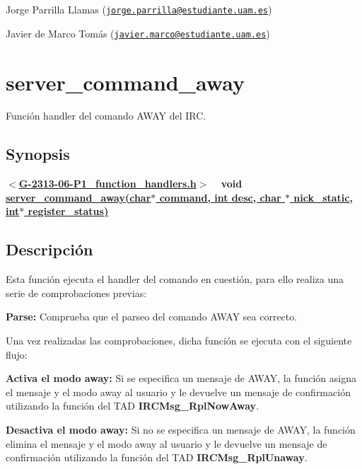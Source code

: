 \begin{DoxyItemize}
\item Jorge Parrilla Llamas (\href{mailto:jorge.parrilla@estudiante.uam.es}{\tt jorge.\+parrilla@estudiante.\+uam.\+es}) 
\item Javier de Marco Tomás (\href{mailto:javier.marco@estudiante.uam.es}{\tt javier.\+marco@estudiante.\+uam.\+es}) 
\end{DoxyItemize}\hypertarget{server_command_away}{}\section{server\+\_\+command\+\_\+away}\label{server_command_away}
Función handler del comando A\+W\+AY del I\+RC.\hypertarget{server_command_away_synopsis_away}{}\subsection{Synopsis}\label{server_command_away_synopsis_away}
{ {\bfseries $<$\hyperlink{G-2313-06-P1__function__handlers_8h}{G-\/2313-\/06-\/\+P1\+\_\+function\+\_\+handlers.\+h}$>$} ~\newline
 {\bfseries void \hyperlink{G-2313-06-P1__function__handlers_8c_a327516a6c48e34b58428f7a502938928}{server\+\_\+command\+\_\+away(char$\ast$ command, int desc, char $\ast$ nick\+\_\+static, int$\ast$ register\+\_\+status)}} } \hypertarget{server_command_away_descripcion_away}{}\subsection{Descripción}\label{server_command_away_descripcion_away}
Esta función ejecuta el handler del comando en cuestión, para ello realiza una serie de comprobaciones previas\+:


\begin{DoxyItemize}
\item {\bfseries Parse\+:} Comprueba que el parseo del comando A\+W\+AY sea correcto. 
\end{DoxyItemize}

Una vez realizadas las comprobaciones, dicha función se ejecuta con el siguiente flujo\+:


\begin{DoxyItemize}
\item {\bfseries Activa el modo away\+:} Si se especifica un mensaje de A\+W\+AY, la función asigna el mensaje y el modo away al usuario y le devuelve un mensaje de confirmación utilizando la función del T\+AD {\bfseries I\+R\+C\+Msg\+\_\+\+Rpl\+Now\+Away}.  
\item {\bfseries Desactiva el modo away\+:} Si no se especifica un mensaje de A\+W\+AY, la función elimina el mensaje y el modo away al usuario y le devuelve un mensaje de confirmación utilizando la función del T\+AD {\bfseries I\+R\+C\+Msg\+\_\+\+Rpl\+Unaway}.  
\end{DoxyItemize}

